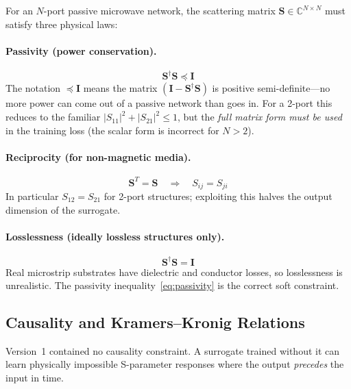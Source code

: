 \documentclass[12pt,a4paper]{article}
\newcommand{\Smat}{\mathbf{S}}
\theoremstyle{definition}
\theoremstyle{plain}
\theoremstyle{remark}
\begin{document}
For an $N$-port passive microwave network, the scattering matrix
$\Smat \in \mathbb{C}^{N \times N}$ must satisfy three physical laws:

\paragraph{Passivity (power conservation).}
\begin{equation}
  \Smat^\dagger \Smat \preceq \mathbf{I}
  \label{eq:passivity}
\end{equation}
The notation $\preceq \mathbf{I}$ means the matrix $(\mathbf{I} - \Smat^\dagger\Smat)$
is positive semi-definite—no more power can come out of a passive network than goes in.
For a 2-port this reduces to the familiar $|S_{11}|^2 + |S_{21}|^2 \leq 1$,
but the \emph{full matrix form must be used} in the training loss (the scalar form is
incorrect for $N > 2$).

\paragraph{Reciprocity (for non-magnetic media).}
\begin{equation}
  \Smat^T = \Smat \quad \Longrightarrow \quad S_{ij} = S_{ji}
  \label{eq:reciprocity}
\end{equation}
In particular $S_{12} = S_{21}$ for 2-port structures; exploiting this halves the
output dimension of the surrogate.

\paragraph{Losslessness (ideally lossless structures only).}
\begin{equation}
  \Smat^\dagger \Smat = \mathbf{I}
  \label{eq:lossless}
\end{equation}
Real microstrip substrates have dielectric and conductor losses, so losslessness is
unrealistic.  The passivity inequality~\eqref{eq:passivity} is the correct soft constraint.

\subsection{Causality and Kramers--Kronig Relations}
\label{sec:kk}

\begin{tcolorbox}[warnbox, title=V1 Gap — Critical Missing Physics]
Version~1 contained no causality constraint.
A surrogate trained without it can learn physically impossible S-parameter responses
where the output \emph{precedes} the input in time.
\end{tcolorbox}
\end{document}

